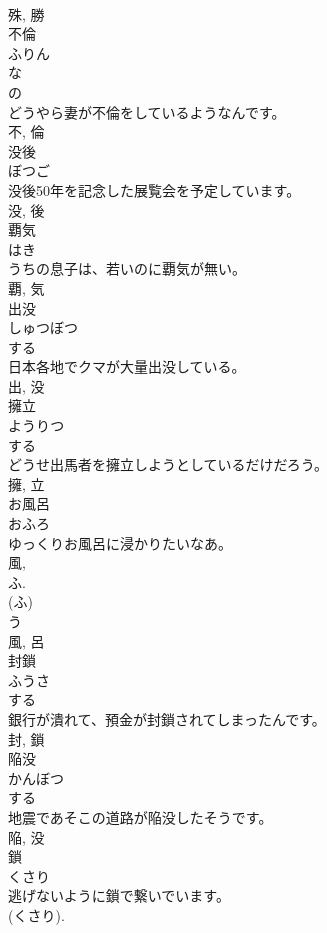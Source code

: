 \documentclass[8pt]{extreport}
\begin{document}
\begin{CJK}{UTF8}{min}
\\	殊, 勝	
\\	不倫	
\\	ふりん	
\\	な 
\\	の 
\\	どうやら妻が不倫をしているようなんです。	
\\	不, 倫	
\\	没後	
\\	ぼつご	
\\	没後50年を記念した展覧会を予定しています。	
\\	没, 後	
\\	覇気	
\\	はき	
\\	うちの息子は、若いのに覇気が無い。	
\\	覇, 気	
\\	出没	
\\	しゅつぼつ	
\\	する 
\\	日本各地でクマが大量出没している。	
\\	出, 没	
\\	擁立	
\\	ようりつ	
\\	する 
\\	どうせ出馬者を擁立しようとしているだけだろう。	
\\	擁, 立	
\\	お風呂	
\\	おふろ	
\\	ゆっくりお風呂に浸かりたいなあ。	
\\	風, 
\\	ふ. 
\\	(ふ) 
\\	う 
\\	風, 呂	
\\	封鎖	
\\	ふうさ	
\\	する 
\\	銀行が潰れて、預金が封鎖されてしまったんです。	
\\	封, 鎖	
\\	陥没	
\\	かんぼつ	
\\	する 
\\	地震であそこの道路が陥没したそうです。	
\\	陥, 没	
\\	鎖	
\\	くさり	
\\	逃げないように鎖で繋いでいます。	
\\	(くさり). 

\end{CJK}
\end{document}
